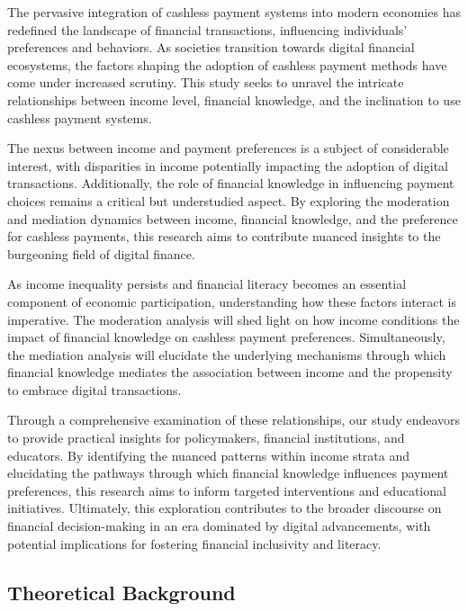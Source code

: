 \documentclass[
  super,
  preprint,
  3p]{elsarticle}
\begin{document}
The pervasive integration of cashless payment systems into modern
economies has redefined the landscape of financial transactions,
influencing individuals' preferences and behaviors. As societies
transition towards digital financial ecosystems, the factors shaping the
adoption of cashless payment methods have come under increased scrutiny.
This study seeks to unravel the intricate relationships between income
level, financial knowledge, and the inclination to use cashless payment
systems.

The nexus between income and payment preferences is a subject of
considerable interest, with disparities in income potentially impacting
the adoption of digital transactions. Additionally, the role of
financial knowledge in influencing payment choices remains a critical
but understudied aspect. By exploring the moderation and mediation
dynamics between income, financial knowledge, and the preference for
cashless payments, this research aims to contribute nuanced insights to
the burgeoning field of digital finance.

As income inequality persists and financial literacy becomes an
essential component of economic participation, understanding how these
factors interact is imperative. The moderation analysis will shed light
on how income conditions the impact of financial knowledge on cashless
payment preferences. Simultaneously, the mediation analysis will
elucidate the underlying mechanisms through which financial knowledge
mediates the association between income and the propensity to embrace
digital transactions.

Through a comprehensive examination of these relationships, our study
endeavors to provide practical insights for policymakers, financial
institutions, and educators. By identifying the nuanced patterns within
income strata and elucidating the pathways through which financial
knowledge influences payment preferences, this research aims to inform
targeted interventions and educational initiatives. Ultimately, this
exploration contributes to the broader discourse on financial
decision-making in an era dominated by digital advancements, with
potential implications for fostering financial inclusivity and literacy.

\hypertarget{theoretical-background}{%
\subsection{Theoretical Background}\label{theoretical-background}}
\end{document}
